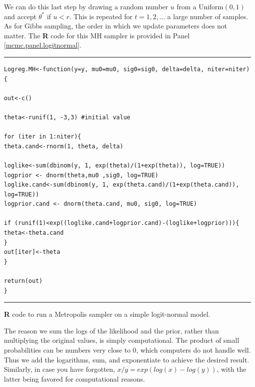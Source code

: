 We can do this last step by drawing a random number $u$ from a
$\mbox{Uniform}(0,1)$ and accept $\theta^{*}$ if
$u<r$.
This is repeated for $t = 1,2,\ldots$ a large number of samples. As for Gibbs sampling, the order in which we update parameters does not matter.
The {\bf R} code for this MH sampler is provided in Panel \ref{mcmc.panel.logitnormal}.

\begin{panel}[ht]
\centering
\rule[0.15in]{\textwidth}{.03in}
{\small
\begin{verbatim}
Logreg.MH<-function(y=y, mu0=mu0, sig0=sig0, delta=delta, niter=niter) {

out<-c()

theta<-runif(1, -3,3) #initial value

for (iter in 1:niter){
theta.cand<-rnorm(1, theta, delta)

loglike<-sum(dbinom(y, 1, exp(theta)/(1+exp(theta)), log=TRUE))
logprior <- dnorm(theta,mu0 ,sig0, log=TRUE)
loglike.cand<-sum(dbinom(y, 1, exp(theta.cand)/(1+exp(theta.cand)),
log=TRUE))
logprior.cand <- dnorm(theta.cand, mu0, sig0, log=TRUE)

if (runif(1)<exp((loglike.cand+logprior.cand)-(loglike+logprior))){
theta<-theta.cand
}
out[iter]<-theta
}

return(out)
}
\end{verbatim}
}
\rule[-0.15in]{\textwidth}{.03in}
\caption{
{\bf R} code to run a Metropolis sampler on a simple logit-normal model.
}
\label{mcmc.panel.logitnormal}
\end{panel}



The reason we sum the logs of the likelihood and the prior, rather
than multiplying the original values, is simply computational. The
product of small probabilities can be numbers very close to 0, which
computers do not handle well. Thus we add the logarithms, sum, and
exponentiate to achieve the desired result. Similarly, in case you
have forgotten, $x/y = exp(log(x)-log(y))$, with
the latter being favored for computational reasons.

